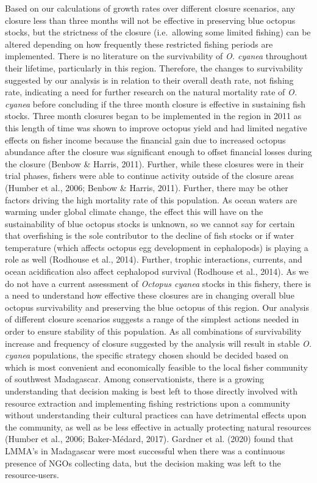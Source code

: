 \documentclass[
  12pt,
]{article}
\begin{document}
Based on our calculations of growth rates over different closure scenarios, any closure less than three months will not be effective in preserving blue octopus stocks, but the strictness of the closure (i.e.~allowing some limited fishing) can be altered depending on how frequently these restricted fishing periods are implemented. There is no literature on the survivability of \emph{O. cyanea} throughout their lifetime, particularly in this region. Therefore, the changes to survivability suggested by our analysis is in relation to their overall death rate, not fishing rate, indicating a need for further research on the natural mortality rate of \emph{O. cyanea} before concluding if the three month closure is effective in sustaining fish stocks. Three month closures began to be implemented in the region in 2011 as this length of time was shown to improve octopus yield and had limited negative effects on fisher income because the financial gain due to increased octopus abundance after the closure was significant enough to offset financial losses during the closure (Benbow \& Harris, 2011). Further, while these closures were in their trial phases, fishers were able to continue activity outside of the closure areas (Humber et al., 2006; Benbow \& Harris, 2011). Further, there may be other factors driving the high mortality rate of this population. As ocean waters are warming under global climate change, the effect this will have on the sustainability of blue octopus stocks is unknown, so we cannot say for certain that overfishing is the sole contributor to the decline of fish stocks or if water temperature (which affects octopus egg development in cephalopods) is playing a role as well (Rodhouse et al., 2014). Further, trophic interactions, currents, and ocean acidification also affect cephalopod survival (Rodhouse et al., 2014). As we do not have a current assessment of \emph{Octopus cyanea} stocks in this fishery, there is a need to understand how effective these closures are in changing overall blue octopus survivability and preserving the blue octopus of this region. Our analysis of different closure scenarios suggests a range of the simplest actions needed in order to ensure stability of this population. As all combinations of survivability increase and frequency of closure suggested by the analysis will result in stable \emph{O. cyanea} populations, the specific strategy chosen should be decided based on which is most convenient and economically feasible to the local fisher community of southwest Madagascar. Among conservationists, there is a growing understanding that decision making is best left to those directly involved with resource extraction and implementing fishing restrictions upon a community without understanding their cultural practices can have detrimental effects upon the community, as well as be less effective in actually protecting natural resources (Humber et al., 2006; Baker-Médard, 2017). Gardner et al. (2020) found that LMMA's in Madagascar were most successful when there was a continuous presence of NGOs collecting data, but the decision making was left to the resource-users.
\end{document}
